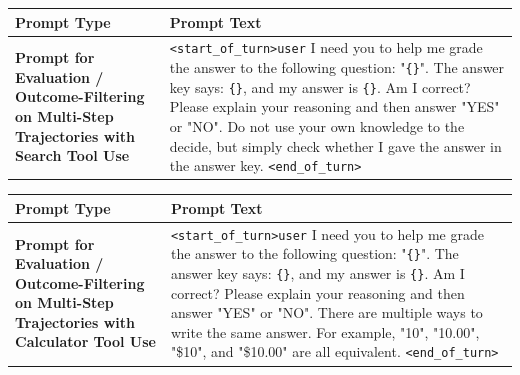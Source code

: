 \documentclass{article} %
\begin{document}
\begin{table}[h!]
    \centering
    \small %
    \begin{tabular}{|p{5cm}|p{8cm}|} %
        \hline
        \textbf{Prompt Type} & \textbf{Prompt Text} \\
        \hline
        \textbf{Prompt for Evaluation / Outcome-Filtering on Multi-Step Trajectories with Search Tool Use} & 
        \raggedright 
        \texttt{\textless start\_of\_turn\textgreater user} \newline
        I need you to help me grade the answer to the following question: "\texttt{\{\}}". \newline
    The answer key says: \texttt{\{\}}, and my answer is \texttt{\{\}}. Am I correct? \newline
    Please explain your reasoning and then answer "YES" or "NO". \newline
    Do not use your own knowledge to the decide, but simply check whether I gave the answer in the answer key.\newline
    \texttt{\textless end\_of\_turn\textgreater} \\
    \end{tabular}
\end{table}


\begin{table}[h!]
    \centering
    \small %
    \begin{tabular}{|p{5cm}|p{8cm}|} %
        \hline
        \textbf{Prompt Type} & \textbf{Prompt Text} \\
        \hline
        \textbf{Prompt for Evaluation / Outcome-Filtering on Multi-Step Trajectories with Calculator Tool Use} & 
        \raggedright 
        \texttt{\textless start\_of\_turn\textgreater user} \newline
        I need you to help me grade the answer to the following question: "\texttt{\{\}}". \newline
    The answer key says: \texttt{\{\}}, and my answer is \texttt{\{\}}. Am I correct? \newline
    Please explain your reasoning and then answer "YES" or "NO". \newline
    There are multiple ways to write the same answer. For example, "10", "10.00", "\$10", and "\$10.00" are all equivalent.\newline
    \texttt{\textless end\_of\_turn\textgreater} \\
    \end{tabular}
\end{table}
\end{document}
